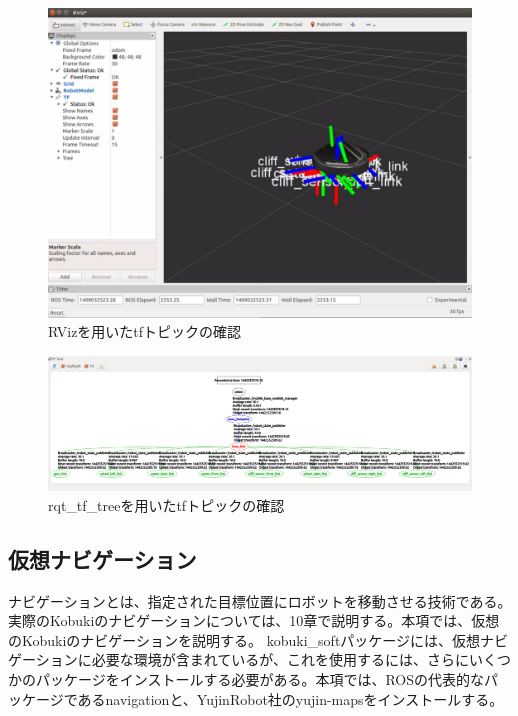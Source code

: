 \begin{itemize}
\begin{figure}[ht]
  \centering
  \includegraphics[width=\columnwidth]{pictures/chapter9/pic_09_24.png}
  \caption{RVizを用いたtfトピックの確認}
\end{figure}

\begin{figure}[ht]
  \centering
  \includegraphics[width=\columnwidth]{pictures/chapter9/pic_09_25.png}
  \caption{rqt\_tf\_treeを用いたtfトピックの確認}
\end{figure}

\subsection{仮想ナビゲーション}

ナビゲーションとは、指定された目標位置にロボットを移動させる技術である。実際のKobukiのナビゲーションについては、10章で説明する。本項では、仮想のKobukiのナビゲーションを説明する。
kobuki\_softパッケージには、仮想ナビゲーションに必要な環境が含まれているが、これを使用するには、さらにいくつかのパッケージをインストールする必要がある。本項では、ROSの代表的なパッケージであるnavigationと、YujinRobot社のyujin-mapsをインストールする。


\end{itemize}
